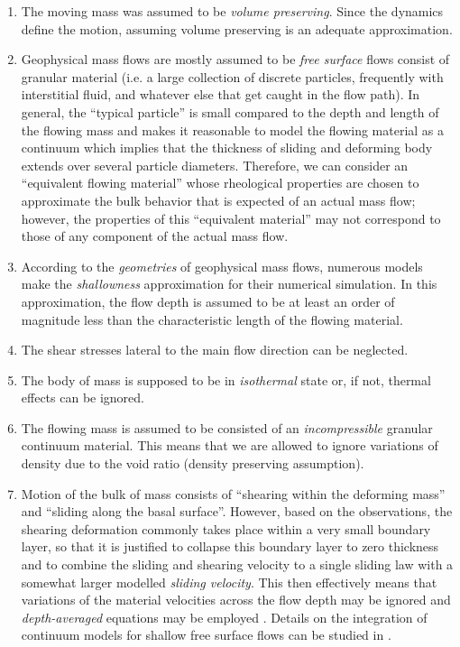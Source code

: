 \documentclass{article}
\begin{document}
\begin{enumerate}
\item The moving mass was assumed to be \textit{volume preserving}. Since the dynamics define the motion, assuming volume preserving is an adequate approximation.
\item Geophysical mass flows are mostly assumed to be \textit{free surface} flows consist of granular material (i.e. a large collection of discrete particles, frequently with interstitial fluid, and whatever else that get caught in the flow path). In general, the ``typical particle'' is small compared to the depth and length of the flowing mass and makes it reasonable to model the flowing material as a continuum which implies that the thickness of sliding and deforming body extends over several particle diameters. Therefore, we can consider an ``equivalent flowing material'' whose rheological properties are chosen to approximate the bulk behavior that is expected of an actual mass flow; however, the properties of this ``equivalent material'' may not correspond to those of any component of the actual mass flow.
\item According to the \textit{geometries} of geophysical mass flows, numerous models make the \textit{shallowness} approximation for their numerical simulation. In this approximation, the flow depth is assumed to be at least an order of magnitude less than the characteristic length of the flowing material.
\item The shear stresses lateral to the main flow direction can be neglected.
\item The body of mass is supposed to be in \textit{isothermal} state or, if not, thermal effects can be ignored.
\item The flowing mass is assumed to be consisted of an \textit{incompressible} granular continuum material. This means that we are allowed to ignore variations of density due to the void ratio (density preserving assumption).
\item Motion of the bulk of mass consists of ``shearing within the deforming mass'' and ``sliding along the basal surface''. However, based on the observations, the shearing deformation commonly takes place within a very small boundary layer, so that it is justified to collapse this boundary layer to zero thickness and to combine the sliding and shearing velocity to a single sliding law with a somewhat larger modelled \textit{sliding velocity}. This then effectively means that variations of the material velocities across the flow depth may be ignored and \textit{depth-averaged} equations may be employed \citep{SavageHutter,Hutter1993}. Details on the integration of continuum models for shallow free surface flows can be studied in \citep{PudasainiHutter2007}.%

\end{enumerate}
\end{document}
